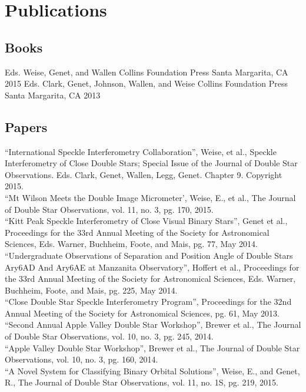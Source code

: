 \section{Publications}

\subsection{Books}
    {Eds. Weise, Genet, and Wallen}
    {Collins Foundation Press}
    {Santa Margarita, CA}
    {2015}
    {Eds. Clark, Genet, Johnson, Wallen, and Weise}
    {Collins Foundation Press}
    {Santa Margarita, CA}
    {2013}

\subsection{Papers}
``International Speckle Interferometry Collaboration'',
    Weise, et al., 
    Speckle Interferometry of Close Double Stars; Special Issue of the Journal of Double Star Observations. 
    Eds. Clark, Genet, Wallen, Legg, Genet. 
    Chapter 9. 
    Copyright 2015.\\
``Mt Wilson Meets the Double Image Micrometer’, 
    Weise, E., et al., 
    The Journal of Double Star Observations, 
    vol. 11, no. 3, pg. 170, 
    2015.\\
``Kitt Peak Speckle Interferometry of Close Visual Binary Stars'', 
    Genet et al., 
    Proceedings for the 33rd Annual Meeting of the Society for Astronomical Sciences, 
    Eds. Warner, Buchheim, Foote, and Mais, 
    pg. 77, 
    May 2014.\\
``Undergraduate Observations of Separation and Position Angle of Double Stars Ary6AD And Ary6AE at Manzanita Observatory'', 
    Hoffert et al., 
    Proceedings for the 33rd Annual Meeting of the Society for Astronomical Sciences, 
    Eds. Warner, Buchheim, Foote, and Mais, 
    pg. 225, 
    May 2014.\\
``Close Double Star Speckle Interferometry Program'', 
    Proceedings for the 32nd Annual Meeting of the Society for Astronomical Sciences, 
    pg. 61, 
    May 2013.\\
``Second Annual Apple Valley Double Star Workshop'', 
    Brewer et al., 
    The Journal of Double Star Observations, 
    vol. 10, no. 3, pg. 245, 
    2014.\\
``Apple Valley Double Star Workshop'', 
    Brewer et al., 
    The Journal of Double Star Observations, 
    vol. 10, no. 3, pg. 160, 
    2014.\\
``A Novel System for Classifying Binary Orbital Solutions'', Weise, E., and Genet, R., The Journal of Double Star Observations, vol. 11, no. 1S, pg. 219, 2015.
